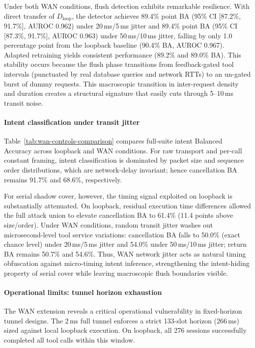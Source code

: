 Under both WAN conditions, flush detection exhibits remarkable resilience. With direct transfer of $D_{\text{loop}}$, the detector achieves 89.4\% point BA (95\% CI [87.2\%, 91.7\%], AUROC 0.962) under 20\,ms/5\,ms jitter and 89.4\% point BA (95\% CI [87.3\%, 91.7\%], AUROC 0.963) under 50\,ms/10\,ms jitter, falling by only 1.0 percentage point from the loopback baseline (90.4\% BA, AUROC 0.967). Adapted retraining yields consistent performance (89.2\% and 89.0\% BA). This stability occurs because the flush phase transitions from feedback-gated tool intervals (punctuated by real database queries and network RTTs) to an un-gated burst of dummy requests. This macroscopic transition in inter-request density and duration creates a structural signature that easily cuts through 5--10\,ms transit noise.


\paragraph{Intent classification under transit jitter}
Table~\ref{tab:wan-controls-comparison} compares full-suite intent Balanced Accuracy across loopback and WAN conditions. For raw transport and per-call constant framing, intent classification is dominated by packet size and sequence order distributions, which are network-delay invariant; hence cancellation BA remains 91.7\% and 68.6\%, respectively.

For serial shadow cover, however, the timing signal exploited on loopback is substantially attenuated. On loopback, residual execution time differences allowed the full attack union to elevate cancellation BA to 61.4\% (11.4 points above size/order). Under WAN conditions, random transit jitter washes out microsecond-level tool service variations: cancellation BA falls to 50.0\% (exact chance level) under 20\,ms/5\,ms jitter and 54.0\% under 50\,ms/10\,ms jitter; return BA remains 50.7\% and 54.6\%. Thus, WAN network jitter acts as natural timing obfuscation against micro-timing intent inference, strengthening the intent-hiding property of serial cover while leaving macroscopic flush boundaries visible.

\paragraph{Operational limits: tunnel horizon exhaustion}
The WAN extension reveals a critical operational vulnerability in fixed-horizon tunnel designs. The 2\,ms full tunnel enforces a strict 133-slot horizon (266\,ms) sized against local loopback execution. On loopback, all 276 sessions successfully completed all tool calls within this window.

